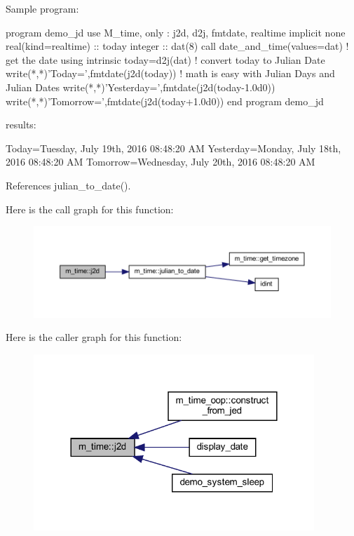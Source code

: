 \begin{DoxyVerb}
\begin{DoxyVerb}Sample program:

 program demo_jd
 use M_time, only : j2d, d2j, fmtdate, realtime
 implicit none
 real(kind=realtime) :: today
 integer :: dat(8)
    call date_and_time(values=dat) ! get the date using intrinsic
    today=d2j(dat)                  ! convert today to Julian Date
    write(*,*)'Today=',fmtdate(j2d(today))
    ! math is easy with Julian Days and Julian Dates
    write(*,*)'Yesterday=',fmtdate(j2d(today-1.0d0))
    write(*,*)'Tomorrow=',fmtdate(j2d(today+1.0d0))
 end program demo_jd

results:

 Today=Tuesday, July 19th, 2016 08:48:20 AM
 Yesterday=Monday, July 18th, 2016 08:48:20 AM
 Tomorrow=Wednesday, July 20th, 2016 08:48:20 AM \end{DoxyVerb}
 

References julian\+\_\+to\+\_\+date().

Here is the call graph for this function\+:
\nopagebreak
\begin{figure}[H]
\begin{center}
\leavevmode
\includegraphics[width=350pt]{namespacem__time_a3ad5cad6df02c53e0429c3602a072e3c_cgraph}
\end{center}
\end{figure}
Here is the caller graph for this function\+:
\nopagebreak
\begin{figure}[H]
\begin{center}
\leavevmode
\includegraphics[width=300pt]{namespacem__time_a3ad5cad6df02c53e0429c3602a072e3c_icgraph}
\end{center}
\end{figure}
\mbox{\label{namespacem__time_abb44cf18cd0a3e420c20469efb056203}} 

\end{DoxyVerb}
